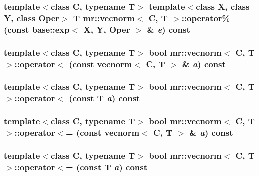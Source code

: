 \subsubsection{\setlength{\rightskip}{0pt plus 5cm}template$<$class C, typename T$>$ template$<$class X, class Y, class Oper$>$ T {\bf mr::vecnorm}$<$ C, T $>$::operator\% (const {\bf base::exp}$<$ X, Y, Oper $>$ \& {\em e}) const\hspace{0.3cm}{\tt  [inline]}}\label{structmr_1_1vecnorm_z55_0}


\subsubsection{\setlength{\rightskip}{0pt plus 5cm}template$<$class C, typename T$>$ bool {\bf mr::vecnorm}$<$ C, T $>$::operator$<$ (const {\bf vecnorm}$<$ C, T $>$ \& {\em a}) const\hspace{0.3cm}{\tt  [inline]}}\label{structmr_1_1vecnorm_z57_4}


\subsubsection{\setlength{\rightskip}{0pt plus 5cm}template$<$class C, typename T$>$ bool {\bf mr::vecnorm}$<$ C, T $>$::operator$<$ (const T {\em a}) const\hspace{0.3cm}{\tt  [inline]}}\label{structmr_1_1vecnorm_z57_0}


\subsubsection{\setlength{\rightskip}{0pt plus 5cm}template$<$class C, typename T$>$ bool {\bf mr::vecnorm}$<$ C, T $>$::operator$<$= (const {\bf vecnorm}$<$ C, T $>$ \& {\em a}) const\hspace{0.3cm}{\tt  [inline]}}\label{structmr_1_1vecnorm_z57_6}


\subsubsection{\setlength{\rightskip}{0pt plus 5cm}template$<$class C, typename T$>$ bool {\bf mr::vecnorm}$<$ C, T $>$::operator$<$= (const T {\em a}) const\hspace{0.3cm}{\tt  [inline]}}\label{structmr_1_1vecnorm_z57_2}


